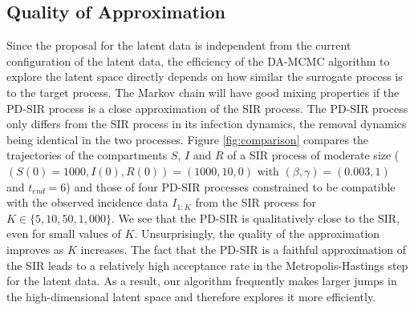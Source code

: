 \documentclass[11pt]{article}
\newcommand{\ram}[1]{{\color{green}{ #1}}}
\begin{document}
	\subsection{Quality of Approximation}
	\label{sec:qua}
	
	Since the proposal for the latent data is independent from the current configuration of the latent data, the efficiency of the DA-MCMC algorithm to explore the latent space directly depends on how similar the surrogate process is to the target process. The Markov chain will have good mixing properties if the PD-SIR process is a close approximation of the SIR process. The PD-SIR process only differs from the SIR process in its infection dynamics, the removal dynamics being identical in the two processes. Figure \ref{fig:comparison} compares the trajectories of the compartments $S$, $I$ and $R$ of a SIR process of moderate size ($(S(0) = 1000, I(0), R(0)) = (1000, 10, 0)$ with $(\beta, \gamma) = (0.003, 1)$ and $t_{end} = 6$) and those of four PD-SIR processes constrained to be compatible with the observed incidence data $I_{1:K}$ from the SIR process for $K \in \{5, 10, 50, 1,000\}$. We see that the PD-SIR is qualitatively close to the SIR, even for small values of $K$. Unsurprisingly, the quality of the approximation improves as $K$ increases.
	The fact that the PD-SIR is a faithful approximation of the SIR leads to a relatively high acceptance rate in the Metropolis-Hastings step for the latent data. As a result, our algorithm frequently makes larger jumps in the high-dimensional latent space and therefore explores it more efficiently.
	
	\ram{Piece-wise linear trajectory of S compartment comes from the fact that it follows a linear death process with piece-wise constant rate.}
	
\end{document}
